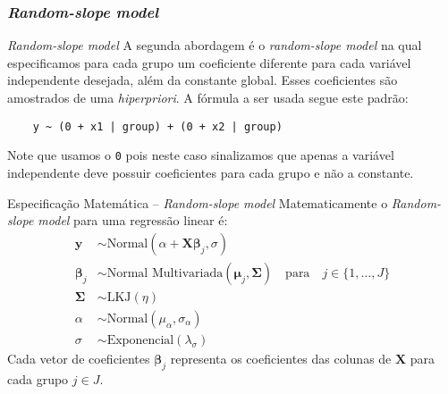 \subsubsection{\textit{Random-slope model}}
\begin{frame}[fragile]{\textit{Random-slope model}}
	A segunda abordagem é o \textit{random-slope model} na qual especificamos para cada
	grupo um coeficiente diferente para cada variável independente desejada,
	além da constante global. Esses coeficientes são amostrados de uma \textit{hiperpriori}.
	\vfill
	A fórmula a ser usada segue este padrão:
	\begin{lstlisting}
    y ~ (0 + x1 | group) + (0 + x2 | group)
  \end{lstlisting}
	\vfill
	Note que usamos o \texttt{0} pois neste caso sinalizamos que apenas a variável
	independente deve possuir coeficientes para cada grupo e não a constante.
\end{frame}

\begin{frame}{Especificação Matemática -- \textit{Random-slope model}}
	Matematicamente o \textit{Random-slope model} para uma regressão linear é:
	$$
		\begin{aligned}
			\boldsymbol{y}       & \sim \text{Normal}(\alpha + \mathbf{X} \boldsymbol{\beta}_{j}, \sigma)   \\
			\boldsymbol{\beta}_j & \sim \text{Normal Multivariada}(\boldsymbol{\mu}_j, \boldsymbol{\Sigma})
			\quad \text{para}\quad j \in \{ 1, \dots, J \}                                                  \\
			\boldsymbol{\Sigma}  & \sim \text{LKJ}(\eta)                                                    \\
			\alpha               & \sim \text{Normal}(\mu_\alpha, \sigma_\alpha)                            \\
			\sigma               & \sim \text{Exponencial}(\lambda_\sigma)
		\end{aligned}
	$$
	Cada vetor de coeficientes $\boldsymbol{\beta}_j$ representa os coeficientes
	das colunas de $\mathbf{X}$ para cada grupo $j \in J$.
\end{frame}

